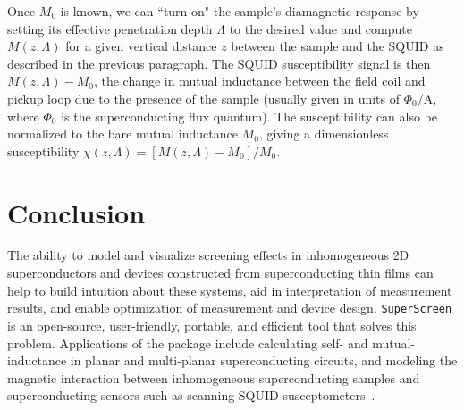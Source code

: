 \documentclass[final,3p,times]{elsarticle}
\newcommand{\inline}[1]{\texttt{#1}\xspace}
\newcommand{\SuperScreen}{\inline{SuperScreen}}
\begin{document}
Once $M_0$ is known, we can ``turn on" the sample's diamagnetic response by setting its effective penetration depth $\Lambda$ to the desired value and compute $M(z, \Lambda)$ for a given vertical distance $z$ between the sample and the SQUID as described in the previous paragraph. The SQUID susceptibility signal is then $M(z, \Lambda) - M_0$, the change in mutual inductance between the field coil and pickup loop due to the presence of the sample (usually given in units of $\Phi_0/\mathrm{A}$, where $\Phi_0$ is the superconducting flux quantum). The susceptibility can also be normalized to the bare mutual inductance $M_0$, giving a dimensionless susceptibility $\chi(z, \Lambda)=[M(z, \Lambda) - M_0] / M_0$.  


\section{Conclusion}
\label{section:conlusion}

The ability to model and visualize screening effects in inhomogeneous 2D superconductors and devices constructed from superconducting thin films can help to build intuition about these systems, aid in interpretation of measurement results, and enable optimization of measurement and device design. \SuperScreen is an open-source, user-friendly, portable, and efficient tool that solves this problem. Applications of the package include calculating self- and mutual-inductance in planar and multi-planar superconducting circuits, and modeling the magnetic interaction between inhomogeneous superconducting samples and superconducting sensors such as scanning SQUID susceptometers~\cite{Kirtley2016-zz}.
\end{document}
